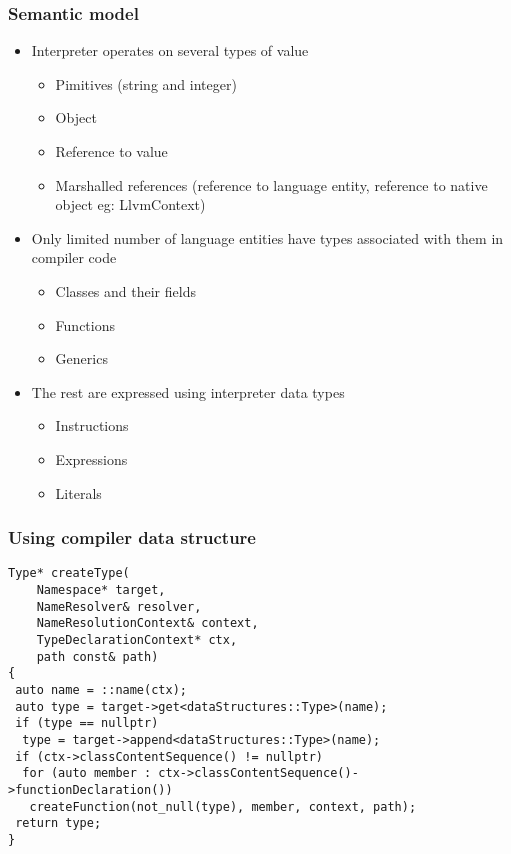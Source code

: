 \begin{frame}
    \frametitle{Semantic model}

    \begin{itemize}
        \item Interpreter operates on several types of value\begin{itemize}
            \item Pimitives (string and integer)
            \item Object
            \item Reference to value
            \item Marshalled references (reference to language entity, reference to native object eg: LlvmContext)
        \end{itemize}
        \item Only limited number of language entities have types associated with them in compiler code\begin{itemize}
            \item Classes and their fields
            \item Functions
            \item Generics
        \end{itemize}
        \item The rest are expressed using interpreter data types\begin{itemize}
            \item Instructions
            \item Expressions
            \item Literals
        \end{itemize}
    \end{itemize}
\end{frame}

\begin{frame}[fragile]
    \frametitle{Using compiler data structure}

    \begin{lstlisting}
Type* createType(
    Namespace* target,
    NameResolver& resolver,
    NameResolutionContext& context,
    TypeDeclarationContext* ctx,
    path const& path)
{
 auto name = ::name(ctx);
 auto type = target->get<dataStructures::Type>(name);
 if (type == nullptr)
  type = target->append<dataStructures::Type>(name);
 if (ctx->classContentSequence() != nullptr)
  for (auto member : ctx->classContentSequence()->functionDeclaration())
   createFunction(not_null(type), member, context, path);
 return type;
}
    \end{lstlisting}

\end{frame}

